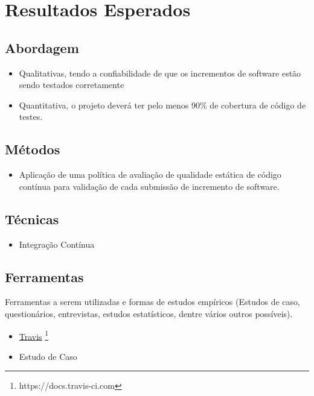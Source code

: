 \section{Resultados Esperados}
\subsection{Abordagem}
\begin{itemize}
    \item Qualitativas, tendo a confiabilidade de que os incrementos de software estão sendo testados corretamente
    \item Quantitativa, o projeto deverá ter pelo menos 90\% de cobertura de código de testes.
\end{itemize}

\subsection{Métodos}
\begin{itemize}
    \item Aplicação de uma política de avaliação de qualidade estática de código contínua para validação de cada submissão de incremento de software.
\end{itemize}

\subsection{Técnicas}
\begin{itemize}
    \item Integração Contínua
\end{itemize}

\subsection{Ferramentas}
Ferramentas a serem utilizadas e formas de estudos empíricos (Estudos de caso, questionários, entrevistas, estudos estatísticos, dentre vários outros possíveis).
\begin{itemize}
    \item \href{https://docs.travis-ci.com}{Travis}%
    \footnote{https://docs.travis-ci.com}
    \item Estudo de Caso
\end{itemize}
